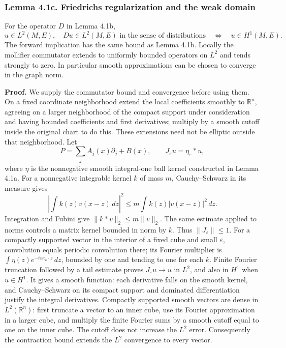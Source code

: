 \documentclass[
  11pt,
]{article}
\begin{document}
\subsubsection{Lemma 4.1c. Friedrichs regularization and the weak
domain}\label{lemma-4.1c.-friedrichs-regularization-and-the-weak-domain}

For the operator \(D\) in Lemma 4.1b, \[
u\in L^2(M,E),\quad Du\in L^2(M,E)
\text{ in the sense of distributions}
\quad\Longleftrightarrow\quad u\in H^1(M,E).
\] The forward implication has the same bound as Lemma 4.1b. Locally the
mollifier commutator extends to uniformly bounded operators on \(L^2\)
and tends strongly to zero. In particular smooth approximations can be
chosen to converge in the graph norm.

\textbf{Proof.} We supply the commutator bound and convergence before
using them. On a fixed coordinate neighborhood extend the local
coefficients smoothly to \(\mathbb R^n\), agreeing on a larger
neighborhood of the compact support under consideration and having
bounded coefficients and first derivatives; multiply by a smooth cutoff
inside the original chart to do this. These extensions need not be
elliptic outside that neighborhood. Let \[
P=\sum_jA_j(x)\partial_j+B(x),\qquad
J_\varepsilon u=\eta_\varepsilon*u ,
\] where \(\eta\) is the nonnegative smooth integral-one ball kernel
constructed in Lemma 4.1a. For a nonnegative integrable kernel \(k\) of
mass \(m\), Cauchy--Schwarz in its measure gives \[
\left|\int k(z)v(x-z)\,dz\right|^2
\leq m\int k(z)|v(x-z)|^2\,dz .
\] Integration and Fubini give \(\|k*v\|_2\leq m\|v\|_2\). The same
estimate applied to norms controls a matrix kernel bounded in norm by
\(k\). Thus \(\|J_\varepsilon\|\leq1\). For a compactly supported vector
in the interior of a fixed cube and small \(\varepsilon\), convolution
equals periodic convolution there; its Fourier multiplier is
\(\int\eta(z)e^{-i\varepsilon\kappa_k\cdot z}\,dz\), bounded by one and
tending to one for each \(k\). Finite Fourier truncation followed by a
tail estimate proves \(J_\varepsilon u\to u\) in \(L^2\), and also in
\(H^1\) when \(u\in H^1\). It gives a smooth function: each derivative
falls on the smooth kernel, and Cauchy--Schwarz on its compact support
and dominated differentiation justify the integral derivatives.
Compactly supported smooth vectors are dense in \(L^2(\mathbb R^n)\):
first truncate a vector to an inner cube, use its Fourier approximation
in a larger cube, and multiply the finite Fourier sums by a smooth
cutoff equal to one on the inner cube. The cutoff does not increase the
\(L^2\) error. Consequently the contraction bound extends the \(L^2\)
convergence to every vector.
\end{document}

